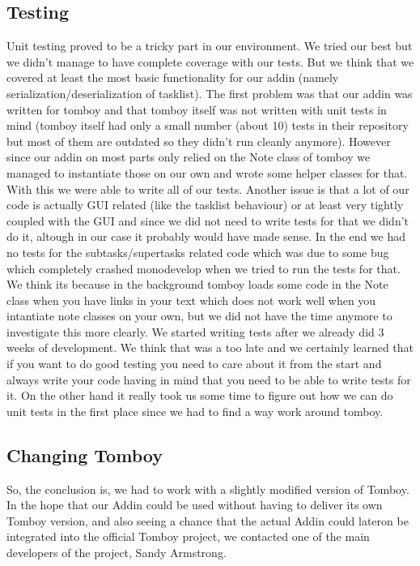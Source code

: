 \documentclass[11pt,a4paper,titlepage]{article}
\begin{document}
\subsection{Testing}
Unit testing proved to be a tricky part in our environment. We tried our best but we didn't manage to have complete coverage with our tests. But we think that we covered at least the most basic functionality for our addin (namely serialization/deserialization of tasklist).
The first problem was that our addin was written for tomboy and that tomboy itself was not written with unit tests in mind (tomboy itself had only a small number (about 10) tests in their repository but most of them are outdated so they didn't run cleanly anymore). However since our addin on most parts only relied on the Note class of tomboy we managed to instantiate those on our own and wrote some helper classes for that. With this we were able to write all of our tests.
Another issue is that a lot of our code is actually GUI related (like the tasklist behaviour) or at least very tightly coupled with the GUI and since we did not need to write tests for that we didn't do it, altough in our case it probably would have made sense.
In the end we had no tests for the subtasks/supertasks related code which was due to some bug which completely crashed monodevelop when we tried to run the tests for that. We think its because in the background tomboy loads some code in the Note class when you have links in your text which does not work well when you intantiate note classes on your own, but we did not have the time anymore to investigate this more clearly.
We started writing tests after we already did 3 weeks of development. We think that was a too late and we certainly learned that if you want to do good testing you need to care about it from the start and always write your code having in mind that you need to be able to write tests for it. On the other hand it really took us some time to figure out how we can do unit tests in the first place since we had to find a way work around tomboy.


\subsection{Changing Tomboy}
So, the conclusion is, we had to work with a slightly modified version of Tomboy. In the hope that our Addin could be used without having to deliver its own Tomboy version, and also seeing a chance that the actual Addin could lateron be integrated into the official Tomboy project, we contacted one of the main developers of the project, Sandy Armstrong.
\end{document}
